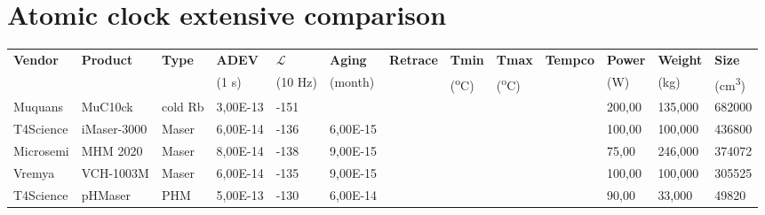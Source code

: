 \eject
{}
\pdfpagewidth=300mm \pdfpageheight=210mm

\section{Atomic clock extensive comparison}
\label{appendix:atomic_clock}

\begin{table}[H]
    \centering
    \begin{tabular}{ll|lllllllllll}
        \hline
        \textbf{Vendor} & \textbf{Product} & \textbf{Type} & \textbf{ADEV} & \textbf{$\mathcal{L}$} & \textbf{Aging} & \textbf{Retrace} & \textbf{Tmin}          & \textbf{Tmax}          & \textbf{Tempco} & \textbf{Power} & \textbf{Weight} & \textbf{Size}           \\
        ~               & ~                & ~             & (1 s)         & (10 Hz)                & (month)        & ~                & (\textsuperscript{o}C) & (\textsuperscript{o}C) & ~               & (W)            & (kg)            & (cm\textsuperscript{3}) \\
        \hline
        Muquans         & MuC10ck          & cold Rb       & 3,00E-13      & -151                   & ~              & ~                & ~                      & ~                      & ~               & 200,00         & 135,000         & 682000                  \\
        T4Science       & iMaser-3000      & Maser         & 6,00E-14      & -136                   & 6,00E-15       & ~                & ~                      & ~                      & ~               & 100,00         & 100,000         & 436800                  \\
        Microsemi       & MHM 2020         & Maser         & 8,00E-14      & -138                   & 9,00E-15       & ~                & ~                      & ~                      & ~               & 75,00          & 246,000         & 374072                  \\
        Vremya          & VCH-1003M        & Maser         & 6,00E-14      & -135                   & 9,00E-15       & ~                & ~                      & ~                      & ~               & 100,00         & 100,000         & 305525                  \\
        T4Science       & pHMaser          & PHM           & 5,00E-13      & -130                   & 6,00E-14       & ~                & ~                      & ~                      & ~               & 90,00          & 33,000          & 49820                   \\

\end{tabular}
\end{table}
